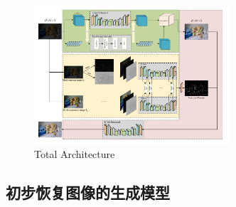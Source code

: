 \documentclass[CJK,aspectratio=169]{beamer}  %
\begin{document}
	\begin{frame}
		
		\begin{figure}[htbp]
			\begin{center}
				\includegraphics[width=0.65\textwidth]{picture/LLIE/My Architecture/Total architecture}
			\end{center}
			\captionsetup{font=scriptsize}
			\caption{
				\label{fig: Total architecture}
				Total Architecture
			}
		\end{figure}
		
	\end{frame}
	
	\subsection{初步恢复图像的生成模型}
	
\end{document}
